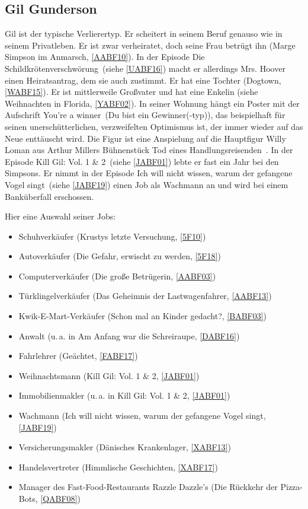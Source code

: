 {\subsection{Gil Gunderson}\label{GilGunderson}
Gil ist der typische Verlierertyp. Er scheitert in seinem Beruf genauso wie in seinem Privatleben. Er ist zwar verheiratet, doch seine Frau betrügt ihn (\glqq Marge Simpson im Anmarsch\grqq, \ref{AABF10}). In der Episode \glqq Die Schildkrötenverschwörung\grqq\ (siehe \ref{UABF16}) macht er allerdings Mrs. Hoover einen Heiratsantrag, dem sie auch zustimmt. Er hat eine Tochter (\glqq Dogtown\grqq, \ref{WABF15}). Er ist mittlerweile Großvater und hat eine Enkelin (siehe \glqq Weihnachten in Florida\grqq, \ref{YABF02}). In seiner Wohnung hängt ein Poster mit der Aufschrift \glqq You're a winner\grqq\ (\glqq Du bist ein Gewinner(-typ)\grqq ), das beispielhaft für seinen unerschütterlichen, verzweifelten Optimismus ist, der immer wieder auf das Neue enttäuscht wird. Die Figur ist eine Anspielung auf die Hauptfigur Willy Loman aus Arthur Millers Bühnenstück \glqq Tod eines Handlungsreisenden\grqq\ \cite{Wikipedia}. In der Episode \glqq Kill Gil: Vol. 1 \& 2\grqq\ (siehe \ref{JABF01}) lebte er fast ein Jahr bei den Simpsons. Er nimmt in der Episode \glqq Ich will nicht wissen, warum der gefangene Vogel singt\grqq\ (siehe \ref{JABF19}) einen Job als Wachmann an und wird bei einem Banküberfall erschossen.

Hier eine Auswahl seiner Jobs:
\begin{itemize}
 	\item Schuhverkäufer (\glqq Krustys letzte Versuchung\grqq , \ref{5F10})
	\item Autoverkäufer (\glqq Die Gefahr, erwischt zu werden\grqq , \ref{5F18})
	\item Computerverkäufer (\glqq Die große Betrügerin\grqq , \ref{AABF03})
	\item Türklingelverkäufer (\glqq Das Geheimnis der Lastwagenfahrer\grqq , \ref{AABF13})
	\item Kwik-E-Mart-Verkäufer (\glqq Schon mal an Kinder gedacht?\grqq , \ref{BABF03})
	\item Anwalt (u.\,a. in \glqq Am Anfang war die Schreiraupe\grqq , \ref{DABF16})
	\item Fahrlehrer (\glqq Geächtet\grqq , \ref{FABF17})
	\item Weihnachtsmann (\glqq Kill Gil: Vol. 1 \& 2\grqq, \ref{JABF01})
	\item Immobilienmakler (u.\,a. in \glqq Kill Gil: Vol. 1 \& 2\grqq, \ref{JABF01})
	\item Wachmann (\glqq Ich will nicht wissen, warum der gefangene Vogel singt\grqq , \ref{JABF19})
	\item Versicherungsmakler (\glqq Dänisches Krankenlager\grqq, \ref{XABF13})
	\item Handelsvertreter (\glqq Himmlische Geschichten\grqq, \ref{XABF17})
	\item Manager des Fast-Food-Restaurants Razzle Dazzle's (\glqq Die Rückkehr der Pizza-Bots\grqq, \ref{QABF08})
\end{itemize}


}
